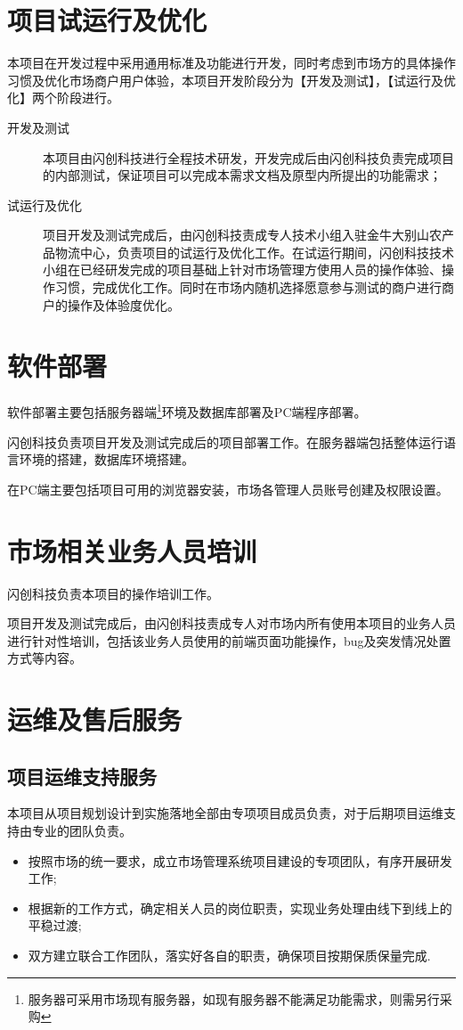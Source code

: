\documentclass[12pt,a4paper,openany]{ctexrep}
\begin{document}
\section{项目试运行及优化}
本项目在开发过程中采用通用标准及功能进行开发，同时考虑到市场方的具体操作习惯及优化市场商户用户体验，本项目开发阶段分为【开发及测试】，【试运行及优化】两个阶段进行。\par
\begin{description}
\item[开发及测试]本项目由闪创科技进行全程技术研发，开发完成后由闪创科技负责完成项目的内部测试，保证项目可以完成本需求文档及原型内所提出的功能需求；
\item[试运行及优化]项目开发及测试完成后，由闪创科技责成专人技术小组入驻金牛大别山农产品物流中心，负责项目的试运行及优化工作。在试运行期间，闪创科技技术小组在已经研发完成的项目基础上针对市场管理方使用人员的操作体验、操作习惯，完成优化工作。同时在市场内随机选择愿意参与测试的商户进行商户的操作及体验度优化。
\end{description}

\section{软件部署}
软件部署主要包括服务器端\footnote{服务器可采用市场现有服务器，如现有服务器不能满足功能需求，则需另行采购}环境及数据库部署及PC端程序部署。\par
闪创科技负责项目开发及测试完成后的项目部署工作。在服务器端包括整体运行语言环境的搭建，数据库环境搭建。\par
在PC端主要包括项目可用的浏览器安装，市场各管理人员账号创建及权限设置。\par

\section{市场相关业务人员培训}
闪创科技负责本项目的操作培训工作。\par
项目开发及测试完成后，由闪创科技责成专人对市场内所有使用本项目的业务人员进行针对性培训，包括该业务人员使用的前端页面功能操作，bug及突发情况处置方式等内容。

\section{运维及售后服务}
\subsection{项目运维支持服务}
本项目从项目规划设计到实施落地全部由专项项目成员负责，对于后期项目运维支持由专业的团队负责。
\begin{itemize}
\item 按照市场的统一要求，成立市场管理系统项目建设的专项团队，有序开展研发工作;
\item 根据新的工作方式，确定相关人员的岗位职责，实现业务处理由线下到线上的平稳过渡;
\item 双方建立联合工作团队，落实好各自的职责，确保项目按期保质保量完成.
\end{itemize}
\end{document}
